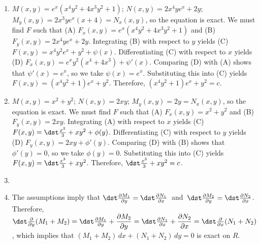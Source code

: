 \documentclass[openany]{book}
\newenvironment{sectionSolutions}{
 \begin{enumerate}[item-label={\thesection.\arabic{enumi}.}]
}{
 \end{enumerate}
}
\begin{document}
\begin{sectionSolutions}
\item
$M(x,y)=e^x(x^4y^2+4x^3y^2+1)$;\;
$N(x,y)=2x^4ye^x+2y$;\;
$M_y(x,y)=2x^3ye^x(x+4)=N_x(x,y)$,
so the  equation is  exact.
We must find $F$ such that
(A) $F_x(x,y)=e^x(x^4y^2+4x^3y^2+1)$ and
(B) $F_y(x,y)=2x^4ye^x+2y$.
Integrating (B) with respect to $y$ yields
(C) $F(x,y)=x^4y^2e^x+y^2+\psi(x)$.
Differentiating (C) with respect to $x$  yields
(D) $F_x(x,y)=e^xy^2(x^4+4x^3)+\psi'(x)$.
Comparing (D) with (A)  shows that
$\psi'(x)=e^x$, so we take
$\psi(x)=e^x$.
Substituting this into (C) yields
$F(x,y)=(x^4y^2+1)e^x+y^2$.
Therefore, $(x^4y^2+1)e^x+y^2=c$.

\addtocounter{enumi}{2}
\item%
$M(x,y)=x^2+y^2$;\;
$N(x,y)=2xy$;\;
$M_y(x,y)=2y=N_x(x,y)$,
so the  equation is exact.
We must find $F$ such that
(A) $F_x(x,y)=x^2+y^2$ and
(B) $F_y(x,y)=2xy$.
Integrating (A) with respect to $x$ yields
(C) $F(x,y)=\dst\frac{x^3}{3}+xy^2+\phi(y)$.
Differentiating (C) with respect to $y$  yields
(D) $F_y(x,y)=2xy+\phi'(y)$.
Comparing (D) with (B)  shows that
$\phi'(y)=0$, so we take
$\phi(y)=0$.
Substituting this into (C) yields
$F(x,y)=\dst\frac{x^3}{3}+xy^2$.
Therefore, $\dst\frac{x^3}{3}+xy^2=c$.


\item
{}

\item
 The assumptions imply that
$\dst\frac{\partial M_1}{\partial y}=\dst\frac{\partial N_1}{\partial x}$\
and\ $\dst\frac{\partial M_2}{\partial y}=\dst\frac{\partial N_2}{\partial
x}$. Therefore, $\dst\frac{\partial }{\partial
y}(M_1+M_2)=\dst\frac{\partial M_1}{\partial y}+\dfrac{\partial
M_2}{\partial y}=\dst\frac{\partial N_1}{\partial x}+\dfrac{\partial
N_2}{\partial x}=\dst\frac{\partial }{\partial x}(N_1+N_2)$,
which implies that $(M_1+M_2)\,dx+(N_1+N_2)\,dy=0$ is exact on $R$.



\end{sectionSolutions}
\end{document}
